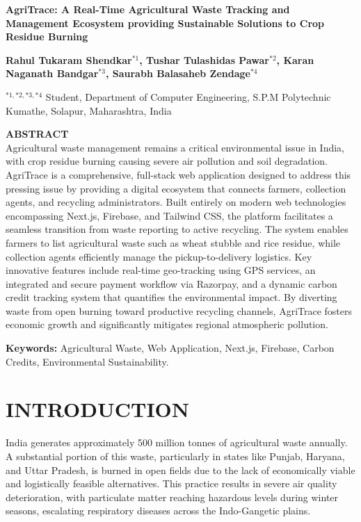 \documentclass[10pt,a4paper]{article}
\begin{document}
\begin{center}
    {\Large \bfseries AgriTrace: A Real-Time Agricultural Waste Tracking and Management Ecosystem providing Sustainable Solutions to Crop Residue Burning\par}
    \vspace{1em}
    {\normalsize \bfseries Rahul Tukaram Shendkar$^{*1}$, Tushar Tulashidas Pawar$^{*2}$, Karan Naganath Bandgar$^{*3}$, Saurabh Balasaheb Zendage$^{*4}$\par}
    \vspace{0.5em}
    {\small $^{*1,*2,*3,*4}$ Student, Department of Computer Engineering, S.P.M Polytechnic Kumathe, Solapur, Maharashtra, India\par}
\end{center}

\vspace{1em}

\noindent \textbf{ABSTRACT}\\
Agricultural waste management remains a critical environmental issue in India, with crop residue burning causing severe air pollution and soil degradation. AgriTrace is a comprehensive, full-stack web application designed to address this pressing issue by providing a digital ecosystem that connects farmers, collection agents, and recycling administrators. Built entirely on modern web technologies encompassing Next.js, Firebase, and Tailwind CSS, the platform facilitates a seamless transition from waste reporting to active recycling. The system enables farmers to list agricultural waste such as wheat stubble and rice residue, while collection agents efficiently manage the pickup-to-delivery logistics. Key innovative features include real-time geo-tracking using GPS services, an integrated and secure payment workflow via Razorpay, and a dynamic carbon credit tracking system that quantifies the environmental impact. By diverting waste from open burning toward productive recycling channels, AgriTrace fosters economic growth and significantly mitigates regional atmospheric pollution.

\vspace{0.5em}
\noindent \textbf{Keywords:} Agricultural Waste, Web Application, Next.js, Firebase, Carbon Credits, Environmental Sustainability.

\section{INTRODUCTION}
India generates approximately 500 million tonnes of agricultural waste annually. A substantial portion of this waste, particularly in states like Punjab, Haryana, and Uttar Pradesh, is burned in open fields due to the lack of economically viable and logistically feasible alternatives. This practice results in severe air quality deterioration, with particulate matter reaching hazardous levels during winter seasons, escalating respiratory diseases across the Indo-Gangetic plains.
\end{document}
